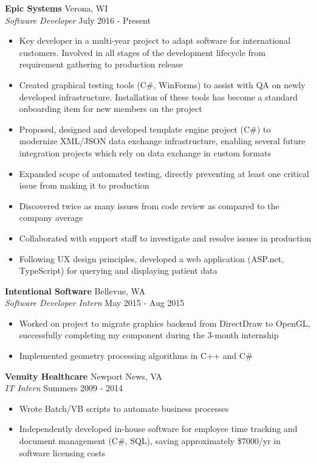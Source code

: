 \documentclass[a4paper]{article}
\begin{document}
\textbf{Epic Systems} \hfill Verona, WI\\
\textit{Software Developer} \hfill July 2016 - Present\\
\vspace{-1mm}
\begin{itemize} \itemsep 1pt
	\item Key developer in a multi-year project to adapt software for international customers. Involved in all stages of the development lifecycle from requirement gathering to production release
	\item Created graphical testing tools (C\#, WinForms) to assist with QA on newly developed infrastructure. Installation of these tools has become a standard onboarding item for new members on the project
	\item Proposed, designed and developed template engine project (C\#) to modernize XML/JSON data exchange infrastructure, enabling several future integration projects which rely on data exchange in custom formats
	\item Expanded scope of automated testing, directly preventing at least one critical issue from making it to production
	\item Discovered twice as many issues from code review as compared to the company average
	\item Collaborated with support staff to investigate and resolve issues in production
	\item Following UX design principles, developed a web application (ASP.net, TypeScript) for querying and displaying patient data
\end{itemize}
\textbf{Intentional Software} \hfill Bellevue, WA\\
\textit{Software Developer Intern} \hfill May 2015 - Aug 2015\\
\vspace{-1mm}
\begin{itemize} \itemsep 1pt
	\item Worked on project to migrate graphics backend from DirectDraw to OpenGL, successfully completing my component during the 3-month internship
	\item Implemented geometry processing algorithms in C++ and C\#
\end{itemize}
\textbf{Venuity Healthcare} \hfill Newport News, VA\\
\textit{IT Intern} \hfill Summers 2009 - 2014\\
\vspace{-1mm}
\begin{itemize} \itemsep 1pt
	\item Wrote Batch/VB scripts to automate business processes
	\item Independently developed in-house software for employee time tracking and document management (C\#, SQL), saving approximately \$7000/yr in software licensing costs
\end{itemize}
\end{document}
